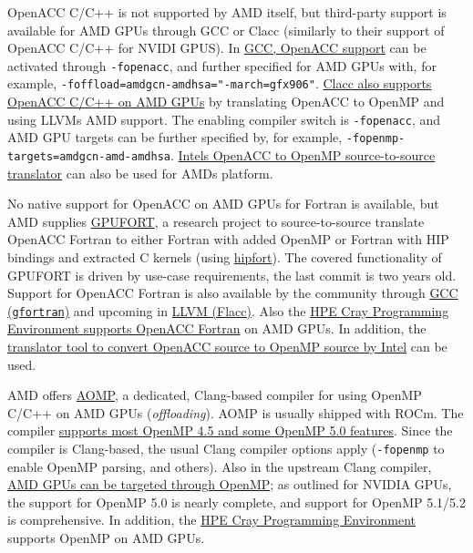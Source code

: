  OpenACC C/C++ is not supported by AMD itself, but third-party support is available for AMD GPUs through GCC or Clacc (similarly to their support of OpenACC C/C++ for NVIDI GPUS). In \href{https://gcc.gnu.org/wiki/Offloading}{GCC, OpenACC support} can be activated through \texttt{-fopenacc}, and further specified for AMD GPUs with, for example, \texttt{-foffload=amdgcn-amdhsa="-march=gfx906"}. \href{https://csmd.ornl.gov/project/clacc}{Clacc also supports OpenACC C/C++ on AMD GPUs} by translating OpenACC to OpenMP and using LLVM\textquotesingle s AMD support. The enabling compiler switch is \texttt{-fopenacc}, and AMD GPU targets can be further specified by, for example, \texttt{-fopenmp-targets=amdgcn-amd-amdhsa}. \href{/\%22https://github.com/intel/intel-application-migration-tool-for-openacc-to-openmp/\%22}{Intel\textquotesingle s OpenACC to OpenMP source-to-source translator} can also be used for AMD\textquotesingle s platform.   

 No native support for OpenACC on AMD GPUs for Fortran is available, but AMD supplies \href{https://github.com/ROCmSoftwarePlatform/gpufort}{GPUFORT}, a research project to source-to-source translate OpenACC Fortran to either Fortran with added OpenMP or Fortran with HIP bindings and extracted C kernels (using \href{https://github.com/ROCmSoftwarePlatform/hipfort}{hipfort}). The covered functionality of GPUFORT is driven by use-case requirements, the last commit is two years old. Support for OpenACC Fortran is also available by the community through \href{https://gcc.gnu.org/onlinedocs/gfortran/OpenACC.html}{GCC (\texttt{gfortran})} and upcoming in \href{https://ieeexplore.ieee.org/document/9651310}{LLVM (Flacc)}. Also the \href{https://cpe.ext.hpe.com/docs/cce/man7/intro_openacc.7.html}{HPE Cray Programming Environment supports OpenACC Fortran} on AMD GPUs. In addition, the \href{https://github.com/intel/intel-application-migration-tool-for-openacc-to-openmp}{translator tool to convert OpenACC source to OpenMP source by Intel} can be used.   

 AMD offers \href{https://github.com/ROCm-Developer-Tools/aomp}{AOMP}, a dedicated, Clang-based compiler for using OpenMP C/C++ on AMD GPUs (\emph{offloading}). AOMP is usually shipped with ROCm. The compiler \href{https://www.exascaleproject.org/wp-content/uploads/2022/02/Elwasif-ECP-sollve_vv_final.pdf}{supports most OpenMP 4.5 and some OpenMP 5.0 features}. Since the compiler is Clang-based, the usual Clang compiler options apply (\texttt{-fopenmp} to enable OpenMP parsing, and others). Also in the upstream Clang compiler, \href{https://clang.llvm.org/docs/OffloadingDesign.html}{AMD GPUs can be targeted through OpenMP}; as outlined for NVIDIA GPUs, the support for OpenMP 5.0 is nearly complete, and support for OpenMP 5.1/5.2 is comprehensive. In addition, the \href{https://cpe.ext.hpe.com/docs/cce/man7/intro_openmp.7.html}{HPE Cray Programming Environment} supports OpenMP on AMD GPUs.   

